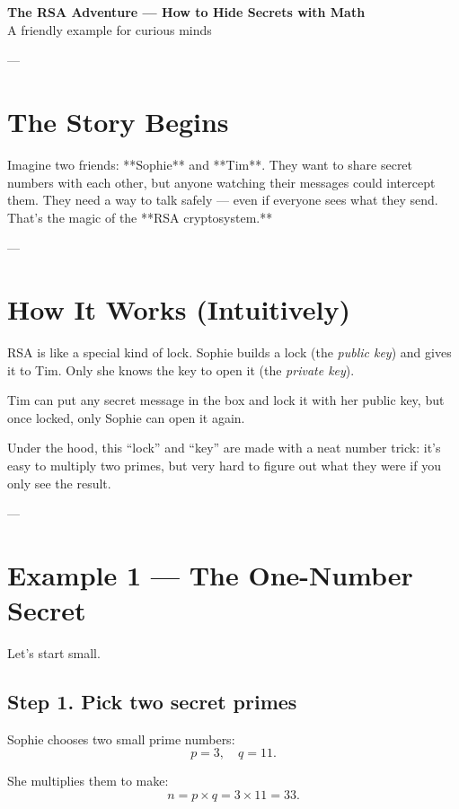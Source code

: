 \documentclass[12pt]{article}
\begin{document}
\begin{center}
    {\LARGE \textbf{The RSA Adventure — How to Hide Secrets with Math}}\\[1em]
    {\large A friendly example for curious minds}
\end{center}

---

\section*{The Story Begins}

Imagine two friends: **Sophie** and **Tim**.  
They want to share secret numbers with each other, but anyone watching their messages could intercept them.  
They need a way to talk safely — even if everyone sees what they send.  
That’s the magic of the **RSA cryptosystem.**

---

\section*{How It Works (Intuitively)}

RSA is like a special kind of lock.  
Sophie builds a lock (the \emph{public key}) and gives it to Tim.  
Only she knows the key to open it (the \emph{private key}).  

Tim can put any secret message in the box and lock it with her public key,  
but once locked, only Sophie can open it again.

Under the hood, this “lock” and “key” are made with a neat number trick:  
it’s easy to multiply two primes, but very hard to figure out what they were if you only see the result.

---

\section*{Example 1 — The One-Number Secret}

Let’s start small.

\subsection*{Step 1. Pick two secret primes}

Sophie chooses two small prime numbers:
\[
p = 3, \quad q = 11.
\]

She multiplies them to make:
\[
n = p \times q = 3 \times 11 = 33.
\]
\end{document}
